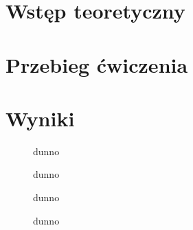 \documentclass[11pt,a4paper]{article}
\begin{document}
\section{Wstęp teoretyczny}
\section{Przebieg ćwiczenia}
\section{Wyniki}

\begin{figure}[H]
\centering
\resizebox{.8\linewidth}{!}{}
\caption{dunno}
\label{fig1}
\end{figure}

\begin{figure}[H]
\centering
\resizebox{.8\linewidth}{!}{}
\caption{dunno}
\label{fig1}
\end{figure}

\begin{figure}[H]
\centering
\resizebox{.8\linewidth}{!}{}
\caption{dunno}
\label{fig1}
\end{figure}

\begin{figure}[H]
\centering
\resizebox{.8\linewidth}{!}{}
\caption{dunno}
\label{fig1}
\end{figure}
\end{document}
